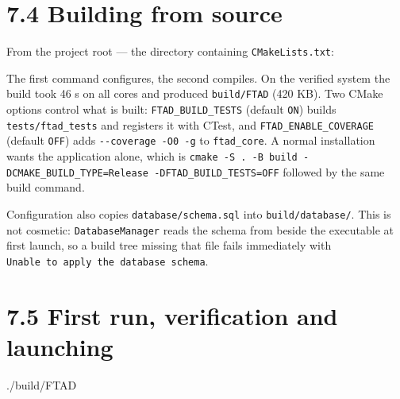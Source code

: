 \documentclass[
  12pt,
]{report}
\newenvironment{Shaded}{}{}
\newcommand{\AttributeTok}[1]{\textcolor[rgb]{0.49,0.56,0.16}{#1}}
\newcommand{\ExtensionTok}[1]{#1}
\newcommand{\FunctionTok}[1]{\textcolor[rgb]{0.02,0.16,0.49}{#1}}
\newcommand{\NormalTok}[1]{#1}
\newcommand{\OperatorTok}[1]{\textcolor[rgb]{0.40,0.40,0.40}{#1}}
\newcommand{\StringTok}[1]{\textcolor[rgb]{0.25,0.44,0.63}{#1}}
\newcommand{\VariableTok}[1]{\textcolor[rgb]{0.10,0.09,0.49}{#1}}
\begin{document}
\section{7.4 Building from source}\label{building-from-source}

From the project root --- the directory containing
\texttt{CMakeLists.txt}:

\begin{Shaded}
\end{Shaded}

The first command configures, the second compiles. On the verified
system the build took 46 s on all cores and produced \texttt{build/\allowbreak{}FTAD}
(420 KB). Two CMake options control what is built:
\texttt{FTAD\_BUILD\_TESTS} (default \texttt{ON}) builds
\texttt{tests/\allowbreak{}ftad\_tests} and registers it with CTest, and
\texttt{FTAD\_ENABLE\_COVERAGE} (default \texttt{OFF}) adds
\texttt{-\/\allowbreak{}-coverage\ -O0\ -g} to \texttt{ftad\_core}. A normal
installation wants the application alone, which is
\texttt{cmake\ -S\ .\ -B\ build\ -DCMAKE\_BUILD\_TYPE=Release\ -DFTAD\_BUILD\_TESTS=OFF}
followed by the same build command.

Configuration also copies \texttt{database/\allowbreak{}schema.sql} into
\texttt{build/\allowbreak{}database/\allowbreak{}}. This is not cosmetic: \texttt{DatabaseManager}
reads the schema from beside the executable at first launch, so a build
tree missing that file fails immediately with
\texttt{Unable\ to\ apply\ the\ database\ schema}.

\section{7.5 First run, verification and
launching}\label{first-run-verification-and-launching}

\begin{Shaded}
\begin{Highlighting}[]
\ExtensionTok{./build/FTAD}
\end{Highlighting}
\end{Shaded}
\end{document}

